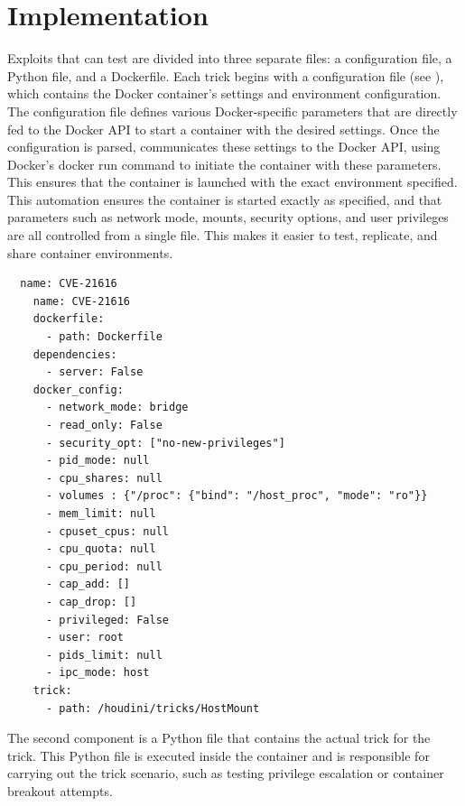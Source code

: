 \section{Implementation}
\label{sec:implementation}

Exploits that \houdini can test are divided into three separate files: a configuration file, a Python file, and a Dockerfile. Each \houdini trick begins with a configuration file (see ), which contains the Docker container's settings and environment configuration. The configuration file defines various Docker-specific parameters that are directly fed to the Docker API to start a container with the desired settings. Once the configuration is parsed, \houdini communicates these settings to the Docker API, using Docker's docker run command to initiate the container with these parameters. This ensures that the container is launched with the exact environment specified. This automation ensures the container is started exactly as specified, and that parameters such as network mode, mounts, security options, and user privileges are all controlled from a single file. This makes it easier to test, replicate, and share container environments.


\begin{listing}[h]
  \caption{Configuration file for CVE-2024-21616.}
  \label{lst:configuration-file}
  \begin{verbatim}
  name: CVE-21616
    name: CVE-21616
    dockerfile:
      - path: Dockerfile
    dependencies:
      - server: False
    docker_config: 
      - network_mode: bridge
      - read_only: False
      - security_opt: ["no-new-privileges"]
      - pid_mode: null
      - cpu_shares: null
      - volumes : {"/proc": {"bind": "/host_proc", "mode": "ro"}}
      - mem_limit: null
      - cpuset_cpus: null
      - cpu_quota: null
      - cpu_period: null
      - cap_add: []
      - cap_drop: []
      - privileged: False
      - user: root
      - pids_limit: null
      - ipc_mode: host
    trick:
      - path: /houdini/tricks/HostMount
  \end{verbatim}
\end{listing}



The second component is a Python file that contains the actual trick for the trick. This Python file is executed inside the container and is responsible for carrying out the trick scenario, such as testing privilege escalation or container breakout attempts.


